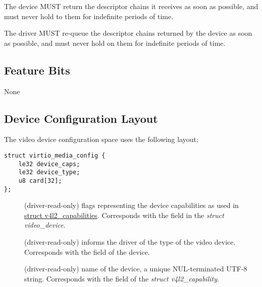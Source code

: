 
The device MUST return the descriptor chains it receives as soon as
possible, and must never hold to them for indefinite periods of time.


The driver MUST re-queue the descriptor chains returned by the device as soon
as possible, and must never hold on them for indefinite periods of time.

\subsection{Feature Bits}\label{sec:Device Types / Media Device / Feature Bits}

None

\subsection{Device Configuration Layout}\label{sec:Device Types / Media Device / Device Configuration Layout}

The video device configuration space uses the following layout:

\begin{lstlisting}
struct virtio_media_config {
    le32 device_caps;
    le32 device_type;
    u8 card[32];
};
\end{lstlisting}

\begin{description}
\item[] (driver-read-only) flags representing the device
capabilities as used in
\href{https://www.kernel.org/doc/html/v4.9/media/uapi/v4l/vidioc-querycap.html#c.v4l2_capability}{struct v4l2_capabilities}.
Corresponds with the  field in the \textit{struct video_device}.
\item[] (driver-read-only) informs the driver of the type
of the video device. Corresponds with the  field of the device.
\item[] (driver-read-only) name of the device, a unique NUL-terminated
UTF-8 string. Corresponds with the  field of the \textit{struct v4l2_capability}.
\end{description}

